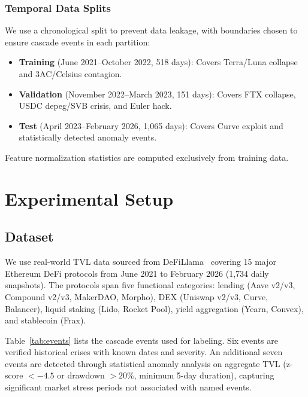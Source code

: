 \documentclass[journal]{IEEEtran}
\begin{document}
\subsubsection{Temporal Data Splits}
We use a chronological split to prevent data leakage, with boundaries chosen to ensure cascade events in each partition:
\begin{itemize}
    \item \textbf{Training} (June 2021--October 2022, 518 days): Covers Terra/Luna collapse and 3AC/Celsius contagion.
    \item \textbf{Validation} (November 2022--March 2023, 151 days): Covers FTX collapse, USDC depeg/SVB crisis, and Euler hack.
    \item \textbf{Test} (April 2023--February 2026, 1,065 days): Covers Curve exploit and statistically detected anomaly events.
\end{itemize}
Feature normalization statistics are computed exclusively from training data.


\section{Experimental Setup}

\subsection{Dataset}

We use real-world TVL data sourced from DeFiLlama~\cite{defillama} covering 15 major Ethereum DeFi protocols from June 2021 to February 2026 (1,734 daily snapshots). The protocols span five functional categories: lending (Aave v2/v3, Compound v2/v3, MakerDAO, Morpho), DEX (Uniswap v2/v3, Curve, Balancer), liquid staking (Lido, Rocket Pool), yield aggregation (Yearn, Convex), and stablecoin (Frax).

Table~\ref{tab:events} lists the cascade events used for labeling. Six events are verified historical crises with known dates and severity. An additional seven events are detected through statistical anomaly analysis on aggregate TVL (z-score $< -4.5$ or drawdown $> 20\%$, minimum 5-day duration), capturing significant market stress periods not associated with named events.
\end{document}
